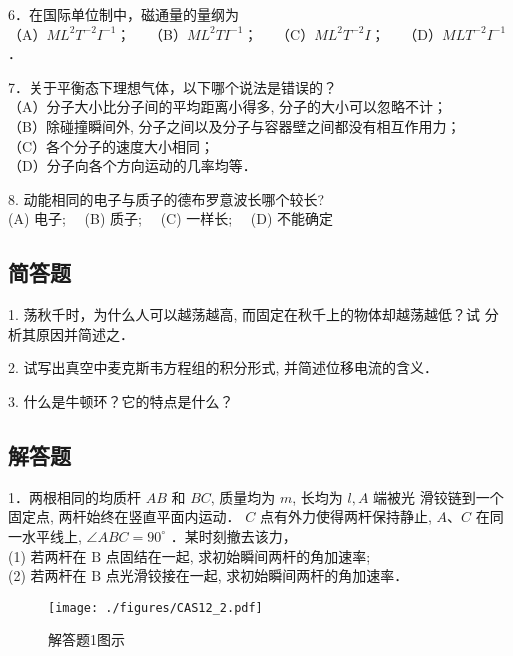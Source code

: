 6．在国际单位制中，磁通量的量纲为\\
（A）$M L^{2} T^{-2} I^{-1}$；$\quad$
（B）$M L^{2} T I^{-1}$；$\quad$
（C）$M L^{2} T^{-2} I$；$\quad$
（D）$M L T^{-2} I^{-1}$．

7．关于平衡态下理想气体，以下哪个说法是错误的？\\
（A）分子大小比分子间的平均距离小得多, 分子的大小可以忽略不计；\\
（B）除碰撞瞬间外, 分子之间以及分子与容器壁之间都没有相互作用力；\\
（C）各个分子的速度大小相同；\\
（D）分子向各个方向运动的几率均等．

8. 动能相同的电子与质子的德布罗意波长哪个较长?\\
(A) 电子;$\quad$
(B) 质子;$\quad$
(C) 一样长;$\quad$
(D) 不能确定

\subsection{简答题}

1. 荡秋千时，为什么人可以越荡越高, 而固定在秋千上的物体却越荡越低？试 分析其原因并简述之．

2. 试写出真空中麦克斯韦方程组的积分形式, 并简述位移电流的含义．

3. 什么是牛顿环？它的特点是什么？
\subsection{解答题}
1．两根相同的均质杆 $A B$ 和 $B C$, 质量均为 $m$, 长均为 $l, A$ 端被光 滑铰链到一个固定点, 两杆始终在竖直平面内运动． $C$ 点有外力使得两杆保持静止, $A $、$ C$ 在同一水平线上, $\angle A B C=90^{\circ}$ ．某时刻撤去该力，\\
(1) 若两杆在 $\mathrm{B}$ 点固结在一起, 求初始瞬间两杆的角加速率;\\
(2) 若两杆在 $\mathrm{B}$ 点光滑铰接在一起, 求初始瞬间两杆的角加速率．
\begin{figure}[ht]
\centering
\texttt{[image: ./figures/CAS12\_2.pdf]}
\caption{解答题1图示} \label{CAS12_fig2}
\end{figure}

